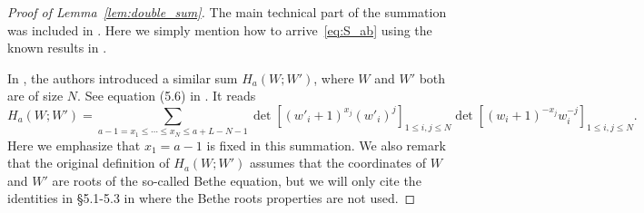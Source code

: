 \documentclass{article}
\numberwithin{equation}{section}
\begin{document}
\begin{proof}[Proof of Lemma~\ref{lem:double_sum}]
	The main technical part of the summation was included in \cite{Baik-Liu17}. Here we simply mention how to arrive~\eqref{eq:S_ab} using the known results in \cite{Baik-Liu17}.
	
	In \cite{Baik-Liu17}, the authors introduced a similar sum $H_a(W;W')$, where $W$ and $W'$ both are of size $N$. See equation (5.6) in \cite{Baik-Liu17}. It reads
	\begin{equation*}
		H_a(W;W') = \sum_{a-1= x_1\le\cdots\le x_N\le a+L-N-1} 
		               \det\left[ (w'_i+1)^{x_j} (w'_i)^j\right]_{1\le i,j\le N}
		               \det\left[ (w_i+1)^{-x_j} w_i^{-j}\right]_{1\le i,j\le N}.
	\end{equation*}
    Here we emphasize that $x_1=a-1$ is fixed in this summation. We also remark that the original definition of $H_a(W;W')$ assumes that the coordinates of $W$ and $W'$ are  roots of the so-called Bethe equation, but we will only cite the identities in \S5.1-5.3 in \cite{Baik-Liu17} where the Bethe roots properties are not used. 
	

\end{proof}
\end{document}
